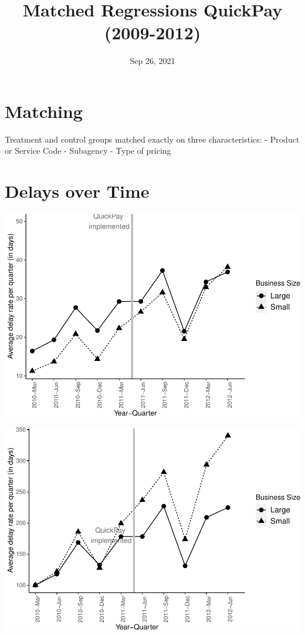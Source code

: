\documentclass[
]{article}
\title{Matched Regressions QuickPay (2009-2012)}
\author{}
\date{\vspace{-2.5em}Sep 26, 2021}
\begin{document}
\maketitle

\hypertarget{matching}{%
\section{Matching}\label{matching}}

Treatment and control groups matched exactly on three characteristics: -
Product or Service Code - Subagency - Type of pricing

\hypertarget{delays-over-time}{%
\section{Delays over Time}\label{delays-over-time}}

\includegraphics{qp_first_matched_files/figure-latex/plot-1.pdf}

\includegraphics{qp_first_matched_files/figure-latex/normalized_plot-1.pdf}
\end{document}
